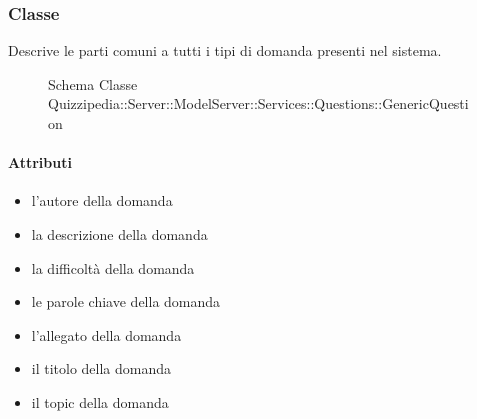 \subsubsection{Classe }
Descrive le parti comuni a tutti i tipi di domanda presenti nel sistema.
\begin{figure}[H]
\centering
\noindent{}
\caption[Schema Classe GenericQuestion]{Schema Classe Quizzipedia::Server::ModelServer::Services::Questions::GenericQuestion}
\end{figure}
\paragraph{Attributi}
\begin{itemize}
\item {}
\newline
l'autore della domanda
\item {}
\newline
la descrizione della domanda
\item {}
\newline
la difficoltà della domanda
\item {}
\newline
le parole chiave della domanda
\item {}
\newline
l'allegato della domanda
\item {}
\newline
il titolo della domanda
\item {}
\newline
il topic della domanda
\end{itemize}
